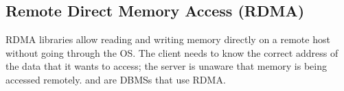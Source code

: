 \documentclass[11pt]{article}
\begin{document}
\subsection*{Remote Direct Memory Access (RDMA)}
RDMA libraries allow reading and writing memory directly on a remote host without going through 
the OS. The client needs to know the correct address of the data that it wants to access; the server 
is unaware that memory is being accessed remotely.  and  are 
DBMSs that use RDMA.

\newpage


\end{document}
